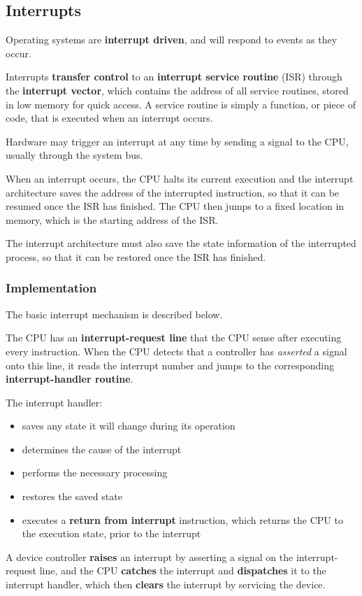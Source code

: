 \documentclass{article}
\begin{document}
\subsection{Interrupts}
Operating systems are \textbf{interrupt driven}, and will respond to
events as they occur.

Interrupts \textbf{transfer control} to an \textbf{interrupt service
routine} (ISR) through the \textbf{interrupt vector}, which contains
the address of all service routines, stored in low memory for quick
access. A service routine is simply a function, or piece of code, that
is executed when an interrupt occurs.

Hardware may trigger an interrupt at any time by sending a signal to
the CPU, usually through the system bus.

When an interrupt occurs, the CPU halts its current execution and the
interrupt architecture saves the address of the interrupted
instruction, so that it can be resumed once the ISR has finished. The
CPU then jumps to a fixed location in memory, which is the starting
address of the ISR.\@

The interrupt architecture must also save the state information of the
interrupted process, so that it can be restored once the ISR has
finished.
\subsubsection{Implementation}
The basic interrupt mechanism is described below.

The CPU has an \textbf{interrupt-request line} that the CPU sense after
executing every instruction. When the CPU detects that a controller has
\textit{asserted} a signal onto this line, it reads the interrupt
number and jumps to the corresponding \textbf{interrupt-handler
routine}.

The interrupt handler:
\begin{itemize}
    \item saves any state it will change during its operation
    \item determines the cause of the interrupt
    \item performs the necessary processing
    \item restores the saved state
    \item executes a \textbf{return from interrupt} instruction, which
          returns the CPU to the execution state, prior to the
          interrupt
\end{itemize}
A device controller \textbf{raises} an interrupt by asserting a signal
on the interrupt-request line, and the CPU \textbf{catches} the
interrupt and \textbf{dispatches} it to the interrupt handler, which
then \textbf{clears} the interrupt by servicing the device.
\end{document}
